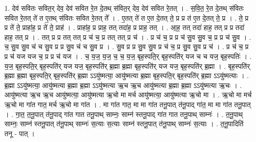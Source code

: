 \documentclass[17pt]{extarticle}
\begin{document}
1. देव॑ सवितः सवित॒र् देव॒ देव॑ सवित रे॒त दे॒तथ् स॑वित॒र् देव॒ देव॑ सवित रे॒तत् । . स॒वि॒त॒ रे॒त दे॒तथ् स॑वितः सवित रे॒तत् ते॑ त ए॒तथ् स॑वितः सवित रे॒तत् ते᳚ । . ए॒तत् ते॑ त ए॒त दे॒तत् ते॒ प्र प्र त॑ ए॒त दे॒तत् ते॒ प्र । . ते॒ प्र प्र ते॑ ते॒ प्राहा॑ह॒ प्र ते॑ ते॒ प्राह॑ । . प्राहा॑ह॒ प्र प्राह॒ तत् तदा॑ह॒ प्र प्राह॒ तत् । . आ॒ह॒ तत् तदा॑ हाह॒ तत् प्र प्र तदा॑ हाह॒ तत् प्र । . तत् प्र प्र तत् तत् प्र च॑ च॒ प्र तत् तत् प्र च॑ । . प्र च॑ च॒ प्र प्र च॑ सु॒व सु॒व च॒ प्र प्र च॑ सु॒व । . च॒ सु॒व सु॒व च॑ च सु॒व प्र प्र सु॒व च॑ च सु॒व प्र । . सु॒व प्र प्र सु॒व सु॒व प्र च॑ च॒ प्र सु॒व सु॒व प्र च॑ । . प्र च॑ च॒ प्र प्र च॑ यज यज च॒ प्र प्र च॑ यज । . च॒ य॒ज॒ य॒ज॒ च॒ च॒ य॒ज॒ बृह॒स्पति॒र् बृह॒स्पति॑र् यज च च यज॒ बृह॒स्पतिः॑ । . य॒ज॒ बृह॒स्पति॒र् बृह॒स्पति॑र् यज यज॒ बृह॒स्पति॑र् ब्र॒ह्मा ब्र॒ह्मा बृह॒स्पति॑र् यज यज॒ बृह॒स्पति॑र् ब्र॒ह्मा । . बृह॒स्पति॑र् ब्र॒ह्मा ब्र॒ह्मा बृह॒स्पति॒र् बृह॒स्पति॑र् ब्र॒ह्मा ऽऽयु॑ष्मत्या॒ आयु॑ष्मत्या ब्र॒ह्मा बृह॒स्पति॒र् बृह॒स्पति॑र् ब्र॒ह्मा ऽऽयु॑ष्मत्याः । . ब्र॒ह्मा ऽऽयु॑ष्मत्या॒ आयु॑ष्मत्या ब्र॒ह्मा ब्र॒ह्मा ऽऽयु॑ष्मत्या ऋ॒च ऋ॒च आयु॑ष्मत्या ब्र॒ह्मा ब्र॒ह्मा ऽऽयु॑ष्मत्या ऋ॒चः । . आयु॑ष्मत्या ऋ॒च ऋ॒च आयु॑ष्मत्या॒ आयु॑ष्मत्या ऋ॒चो मा मर्च आयु॑ष्मत्या॒ आयु॑ष्मत्या ऋ॒चो मा । . ऋ॒चो मा मर्च ऋ॒चो मा गा॑त गात॒ मर्च ऋ॒चो मा गा॑त । . मा गा॑त गात॒ मा मा गा॑त तनू॒पात् त॑नू॒पाद् गा॑त॒ मा मा गा॑त तनू॒पात् । . गा॒त॒ त॒नू॒पात् त॑नू॒पाद् गा॑त गात तनू॒पाथ् साम्नः॒ साम्न॑ स्तनू॒पाद् गा॑त गात तनू॒पाथ् साम्नः॑ । . त॒नू॒पाथ् साम्नः॒ साम्न॑ स्तनू॒पात् त॑नू॒पाथ् साम्नः॑ स॒त्याः स॒त्याः साम्न॑ स्तनू॒पात् त॑नू॒पाथ् साम्नः॑ स॒त्याः । . त॒नू॒पादिति॑ तनू - पात् । \newline
\end{document}
